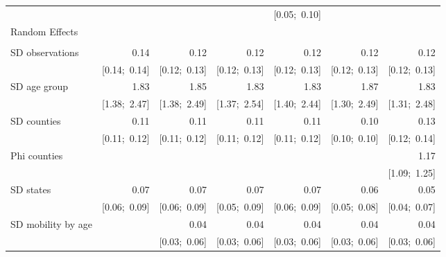 \begin{sidewaystable}[htp]
\begin{center}
{\begin{tabular}{l D{.}{.}{6.11} D{.}{.}{6.11} D{.}{.}{6.11} D{.}{.}{6.11} D{.}{.}{6.11} D{.}{.}{6.11} }
                               &                 &                 &                 & [0.05;\ 0.10]   &                 &                 \\
Random Effects                 &                 &                 &                 &                 &                 &                 \\
                               &                 &                 &                 &                 &                 &                 \\
\quad SD observations          & 0.14            & 0.12            & 0.12            & 0.12            & 0.12            & 0.12            \\
                               & [0.14;\ 0.14]   & [0.12;\ 0.13]   & [0.12;\ 0.13]   & [0.12;\ 0.13]   & [0.12;\ 0.13]   & [0.12;\ 0.13]   \\
\quad SD age group             & 1.83            & 1.85            & 1.83            & 1.83            & 1.87            & 1.83            \\
                               & [1.38;\ 2.47]   & [1.38;\ 2.49]   & [1.37;\ 2.54]   & [1.40;\ 2.44]   & [1.30;\ 2.49]   & [1.31;\ 2.48]   \\
\quad SD counties              & 0.11            & 0.11            & 0.11            & 0.11            & 0.10            & 0.13            \\
                               & [0.11;\ 0.12]   & [0.11;\ 0.12]   & [0.11;\ 0.12]   & [0.11;\ 0.12]   & [0.10;\ 0.10]   & [0.12;\ 0.14]   \\
\quad Phi counties             &                 &                 &                 &                 &                 & 1.17            \\
                               &                 &                 &                 &                 &                 & [1.09;\ 1.25]   \\
\quad SD states                & 0.07            & 0.07            & 0.07            & 0.07            & 0.06            & 0.05            \\
                               & [0.06;\ 0.09]   & [0.06;\ 0.09]   & [0.05;\ 0.09]   & [0.06;\ 0.09]   & [0.05;\ 0.08]   & [0.04;\ 0.07]   \\
\quad SD mobility by age       &                 & 0.04            & 0.04            & 0.04            & 0.04            & 0.04            \\
                               &                 & [0.03;\ 0.06]   & [0.03;\ 0.06]   & [0.03;\ 0.06]   & [0.03;\ 0.06]   & [0.03;\ 0.06]   \\

\end{tabular}}
\end{center}
\end{sidewaystable}
